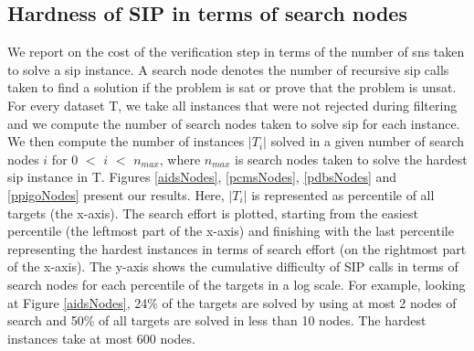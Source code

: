 \documentclass{l4proj}
\newcounter{example}[section]
\begin{document}
\subsection{Hardness of SIP in terms of search nodes}
We report on the cost of the verification step in terms of the number of \glspl{sn} taken to solve a \gls{sip} instance. A search node denotes the number of recursive \gls{sip} calls taken to find a solution if the problem is \gls{sat} or prove that the problem is \gls{unsat}. For every dataset T, we take all instances that were not rejected during filtering and we compute the number of search nodes taken to solve \gls{sip} for each instance. We then compute the number of instances $|T_i|$ solved in a given number of search nodes $i$ for $0$ $<$ $i$ $<$ $n_{max}$, where  $n_{max}$ is search nodes taken to solve the hardest \gls{sip} instance in T. Figures \ref{aidsNodes}, \ref{pcmsNodes}, \ref{pdbsNodes} and \ref{ppigoNodes} present our results. Here, $|T_i|$ is represented as percentile of all targets (the x-axis). The search effort is plotted, starting from the easiest percentile (the leftmost part of the x-axis) and finishing with the last percentile representing the hardest instances in terms of search effort (on the rightmost part of the x-axis). The y-axis shows the cumulative difficulty of SIP calls in terms of search nodes for each percentile of the targets in a log scale. For example, looking at Figure \ref{aidsNodes}, 24\% of the targets are solved by using at most 2 nodes of search and 50\% of all targets are solved in less than 10 nodes. The hardest instances take at most 600 nodes.
\end{document}
